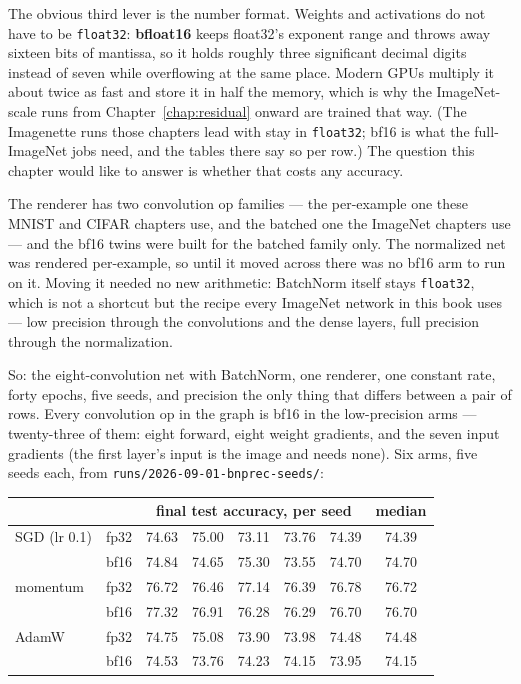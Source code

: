 The obvious third lever is the number format. Weights and activations do
not have to be \texttt{float32}: \textbf{bfloat16} keeps float32's
exponent range and throws away sixteen bits of mantissa, so it holds
roughly three significant decimal digits instead of seven while
overflowing at the same place. Modern GPUs multiply it about twice as
fast and store it in half the memory, which is why the ImageNet-scale runs
from Chapter~\ref{chap:residual} onward are trained that way. (The
Imagenette runs those chapters lead with stay in \texttt{float32}; bf16 is
what the full-ImageNet jobs need, and the tables there say so per row.) The
question this chapter would like to answer is whether that costs any
accuracy.

\medskip\noindent The renderer has two convolution op
families --- the per-example one these MNIST and CIFAR chapters use, and
the batched one the ImageNet chapters use --- and the bf16 twins were
built for the batched family only. The normalized net was rendered
per-example, so until it moved across there was no bf16 arm to run on it.
Moving it needed no new arithmetic: BatchNorm itself stays
\texttt{float32}, which is not a shortcut but the recipe every ImageNet
network in this book uses --- low precision through the convolutions and
the dense layers, full precision through the normalization.

\medskip\noindent So: the eight-convolution net with BatchNorm,
one renderer, one constant rate, forty epochs, five seeds, and precision
the only thing that differs between a pair of rows. Every convolution
op in the graph is bf16 in the low-precision arms --- twenty-three of
them: eight forward, eight weight gradients, and the seven input
gradients (the first layer's input is the image and needs none). Six
arms, five seeds each, from
\texttt{runs/2026-09-01-bnprec-seeds/}:

\begin{center}
\small
\begin{tabular}{l l r r r r r c}
\hline
 & & \multicolumn{5}{c}{final test accuracy, per seed} & median \\
\hline
SGD (lr 0.1)   & fp32 & 74.63 & 75.00 & 73.11 & 73.76 & 74.39 & 74.39 \\
               & bf16 & 74.84 & 74.65 & 75.30 & 73.55 & 74.70 & 74.70 \\[2pt]
momentum       & fp32 & 76.72 & 76.46 & 77.14 & 76.39 & 76.78 & 76.72 \\
               & bf16 & 77.32 & 76.91 & 76.28 & 76.29 & 76.70 & 76.70 \\[2pt]
AdamW          & fp32 & 74.75 & 75.08 & 73.90 & 73.98 & 74.48 & 74.48 \\
               & bf16 & 74.53 & 73.76 & 74.23 & 74.15 & 73.95 & 74.15 \\
\hline
\end{tabular}
\end{center}

